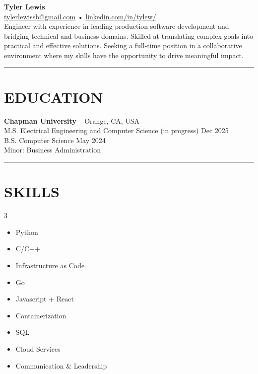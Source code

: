\documentclass[a4paper,10pt]{article}
\begin{document}
\begin{center}
\textbf{\Large Tyler Lewis}\\[4pt]
\href{mailto:tylerlewissb@gmail.com}{tylerlewissb@gmail.com} • \href{https://linkedin.com/in/tylew/}{linkedin.com/in/tylew/}\\[8pt]
Engineer with experience in leading production software development and bridging technical and business domains. Skilled at translating complex goals into practical and effective solutions. Seeking a full-time position in a collaborative environment where my skills have the opportunity to drive meaningful impact.

\end{center}

\noindent\rule{\textwidth}{0.4pt}

\section*{EDUCATION}
\textbf{Chapman University} – Orange, CA, USA\\
M.S. Electrical Engineering and Computer Science (in progress) \hfill Dec 2025\\
B.S. Computer Science \hfill May 2024\\
Minor: Business Administration

\noindent\rule{\textwidth}{0.4pt}

\section*{SKILLS}
\begin{multicols}{3}
    \begin{itemize}[leftmargin=*]
      \item Python
      \item C/C++
      \item Infrastructure as Code
      \item Go
      \item Javascript + React
      \item Containerization
      \item SQL
      \item Cloud Services
      \item Communication \& Leadership
    \end{itemize}
\end{multicols}
\end{document}
